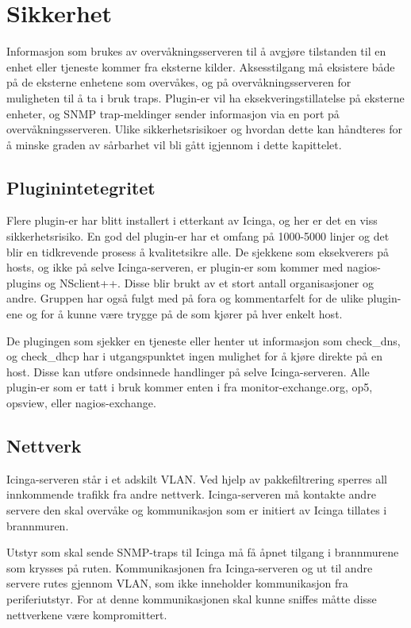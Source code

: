 \chapter{Sikkerhet}
Informasjon som brukes av overvåkningsserveren til å avgjøre tilstanden til en enhet eller tjeneste kommer fra eksterne kilder. Aksesstilgang må eksistere både på de eksterne enhetene som overvåkes, og på overvåkningsserveren for muligheten til å ta i bruk traps. Plugin-er vil ha eksekveringstillatelse på eksterne enheter, og SNMP trap-meldinger sender informasjon via en port på overvåkningsserveren. Ulike sikkerhetsrisikoer og hvordan dette kan håndteres for å minske graden av sårbarhet vil bli gått igjennom i dette kapittelet.

\section{Pluginintetegritet}
Flere plugin-er har blitt installert i etterkant av Icinga, og her er det en viss sikkerhetsrisiko. En god del plugin-er har et omfang på 1000-5000 linjer og det blir en tidkrevende prosess å kvalitetsikre alle. De sjekkene som eksekverers på hosts, og ikke på selve Icinga-serveren, er plugin-er som kommer med nagios-plugins og NSclient++. Disse blir brukt av et stort antall organisasjoner og andre. Gruppen har også fulgt med på fora og kommentarfelt for de ulike plugin-ene og for å kunne være trygge på de som kjører på hver enkelt host. 

De plugingen som sjekker en tjeneste eller henter ut informasjon som check\_dns, og check\_dhcp har i utgangspunktet ingen mulighet for å kjøre direkte på en host. Disse kan utføre ondsinnede handlinger på selve Icinga-serveren. Alle plugin-er som er tatt i bruk kommer enten i fra monitor-exchange.org, op5, opsview, eller nagios-exchange.
\section{Nettverk}
Icinga-serveren står i et adskilt VLAN. Ved hjelp av pakkefiltrering sperres all innkommende trafikk fra andre nettverk. Icinga-serveren må kontakte andre servere den skal overvåke og kommunikasjon som er initiert av Icinga tillates i brannmuren. 

Utstyr som skal sende SNMP-traps til Icinga må få åpnet tilgang i brannmurene som krysses på ruten. Kommunikasjonen fra Icinga-serveren og ut til andre servere rutes gjennom VLAN, som ikke inneholder kommunikasjon fra periferiutstyr. For at denne kommunikasjonen skal kunne sniffes måtte disse nettverkene være kompromittert.
